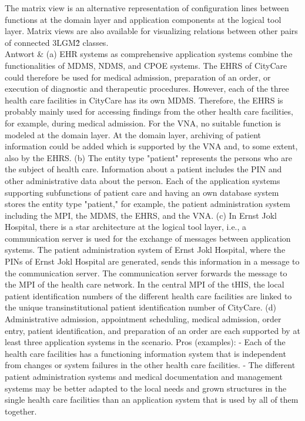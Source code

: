 The matrix view is an alternative representation of configuration lines between functions at the domain layer and application components at the logical tool layer. Matrix views are also available for visualizing relations between other pairs of connected 3LGM\^2 classes. \\
Antwort & (a) EHR systems as comprehensive application systems combine the functionalities of MDMS, NDMS, and CPOE systems. The EHRS of CityCare could therefore be used for medical admission, preparation of an order, or execution of diagnostic and therapeutic procedures. However, each of the three health care facilities in CityCare has its own MDMS. Therefore, the EHRS is probably mainly used for accessing findings from the other health care facilities, for example, during medical admission. For the VNA, no suitable function is modeled at the domain layer. At the domain layer, archiving of patient information could be added which is supported by the VNA and, to some extent, also by the EHRS.
(b) The entity type "patient" represents the persons who are the subject of health care. Information about a patient includes the PIN and other administrative data about the person. Each of the application systems supporting subfunctions of patient care and having an own database system stores the entity type "patient," for example, the patient administration system including the MPI, the MDMS, the EHRS, and the VNA.
(c) In Ernst Jokl Hospital, there is a star architecture at the logical tool layer, i.e., a communication server is used for the exchange of messages between application systems. The patient administration system of Ernst Jokl Hospital, where the PINs of Ernst Jokl Hospital are generated, sends this information in a message to the communication server. The communication server forwards the message to the MPI of the health care network. In the central MPI of the tHIS, the local patient identification numbers of the different health care facilities are linked to the unique transinstitutional patient identification number of CityCare.
(d) Administrative admission, appointment scheduling, medical admission, order entry, patient identification, and preparation of an order are each supported by at least three application systems in the scenario.
Pros (examples):
- Each of the health care facilities has a functioning information system that is independent from changes or system failures in the other health care facilities.
- The different patient administration systems and medical documentation and management systems may be better adapted to the local needs and grown structures in the single health care facilities than an application system that is used by all of them together.

